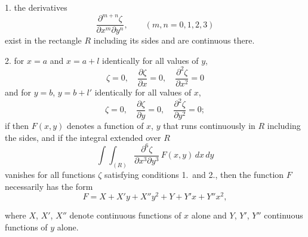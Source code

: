 \documentclass{article}
\begin{document}
1. the derivatives
\[
\frac{\partial^{m+n} \zeta}{\partial x^m \partial y^n}, \qquad (m, n = 0, 1, 2, 3)
\]
exist in the rectangle $R$ including its sides and are continuous there.

2. for $x=a$ and $x=a+l$ identically for all values of $y$,
\[
\zeta = 0, \quad \frac{\partial\zeta}{\partial x} = 0, \quad \frac{\partial^2\zeta}{\partial x^2} = 0
\]
and for $y=b$, $y=b+l'$ identically for all values of $x$,
\[
\zeta = 0, \quad \frac{\partial\zeta}{\partial y} = 0, \quad \frac{\partial^2\zeta}{\partial y^2} = 0;
\]
if then $F(x, y)$ denotes a function of $x$, $y$ that runs continuously in $R$ including the sides, and if the integral extended over $R$
\[
\int\!\!\int_{(R)} \frac{\partial^6\zeta}{\partial x^3 \partial y^3}\,F(x, y)\,dx\,dy
\]
vanishes for all functions $\zeta$ satisfying conditions 1.\ and 2., then the function $F$ necessarily has the form
\[
F = X + X'y + X''y^2 + Y + Y'x + Y''x^2,
\]

where $X$, $X'$, $X''$ denote continuous functions of $x$ alone and $Y$, $Y'$, $Y''$ continuous functions of $y$ alone.
\end{document}
